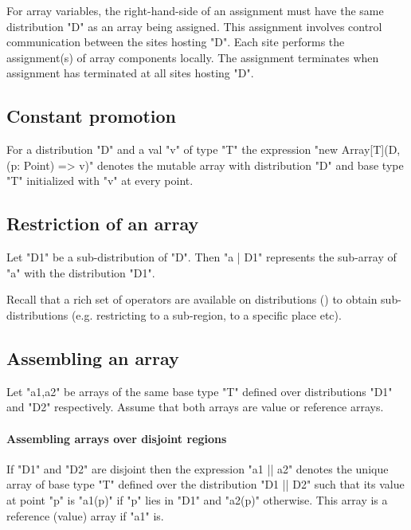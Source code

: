 For array variables, the right-hand-side of an assignment must
have the same distribution \xcd"D" as an array being assigned. This
assignment involves
control communication between the sites hosting \xcd"D". Each
site performs the assignment(s) of array components locally. The
assignment terminates when assignment has terminated at all
sites hosting \xcd"D".

\subsection{Constant promotion}\label{ConstantArray}

For a distribution \xcd"D" and a val \xcd"v" of
type \xcd"T" the expression \xcd"new Array[T](D, (p: Point) => v)"
denotes the mutable array with
distribution \xcd"D" and base type \xcd"T" initialized with \xcd"v"
at every point.

\subsection{Restriction of an array}

Let \xcd"D1" be a sub-distribution of \xcd"D". Then \xcd"a | D1"
represents the sub-array of \xcd"a" with the distribution \xcd"D1".

Recall that a rich set of operators are available on distributions
() to obtain sub-distributions
(e.g. restricting to a sub-region, to a specific place etc).

\subsection{Assembling an array}
Let \xcd"a1,a2" be arrays of the same base type \xcd"T" defined over
distributions \xcd"D1" and \xcd"D2" respectively. Assume that both
arrays are value or reference arrays. 
\paragraph{Assembling arrays over disjoint regions}

If \xcd"D1" and \xcd"D2" are disjoint then the expression \xcd"a1 || a2" denotes the unique array of base type \xcd"T" defined over the
distribution \xcd"D1 || D2" such that its value at point \xcd"p" is
\xcd"a1(p)" if \xcd"p" lies in \xcd"D1" and \xcd"a2(p)"
otherwise. This array is a reference (value) array if \xcd"a1" is.

